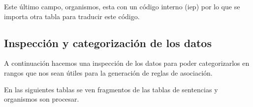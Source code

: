 \documentclass[runningheads,a4paper]{llncs}
\newenvironment{Shaded}{}{}
\newcommand{\KeywordTok}[1]{\textcolor[rgb]{0.00,0.44,0.13}{\textbf{{#1}}}}
\newcommand{\StringTok}[1]{\textcolor[rgb]{0.25,0.44,0.63}{{#1}}}
\newcommand{\CommentTok}[1]{\textcolor[rgb]{0.38,0.63,0.69}{\textit{{#1}}}}
\newcommand{\NormalTok}[1]{{#1}}
\newcommand{\OperatorTok}[1]{\textcolor[rgb]{0.40,0.40,0.40}{{#1}}}
\begin{document}
Este último campo, organismos, esta con un código interno (iep) por lo
que se importa otra tabla para traducir este código.

\begin{Shaded}
\end{Shaded}

\subsection{Inspección y categorización de los
datos}\label{inspeccion-y-categorizacion-de-los-datos}

A continuación hacemos una inspección de los datos para poder
categorizarlos en rangos que nos sean útiles para la generación de
reglas de asociación.

En las siguientes tablas se ven fragmentos de las tablas de sentencias y
organismos son procesar.

\end{document}
